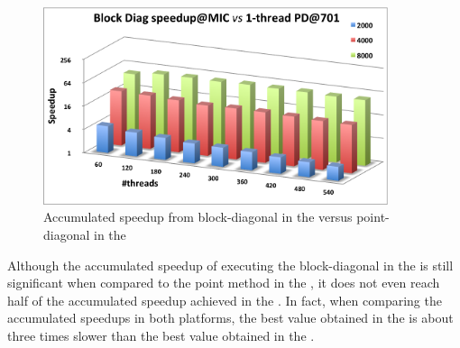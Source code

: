 \documentclass[../thesis]{subfiles}
\begin{document}
	\begin{figure}[htp]
		\begin{center}
			\includegraphics[width=0.9\textwidth]{assets/images/mic/mic-cpu-speedup-accumulated.png}
		\end{center}
		\caption{Accumulated speedup from block-diagonal in the \intel\xeonphi versus point-diagonal in the \cpu}
		\label{fig:mic:mic-cpu:speedup:accumulated}
	\end{figure}

	Although the accumulated speedup of executing the block-diagonal in the \intel\xeonphi is still significant when compared to the point method in the \cpu, it does not even reach half of the accumulated speedup achieved in the \cpu. In fact, when comparing the accumulated speedups in both platforms, the best value obtained in the \intel\xeonphi is about three times slower than the best value obtained in the \cpu.
\end{document}
